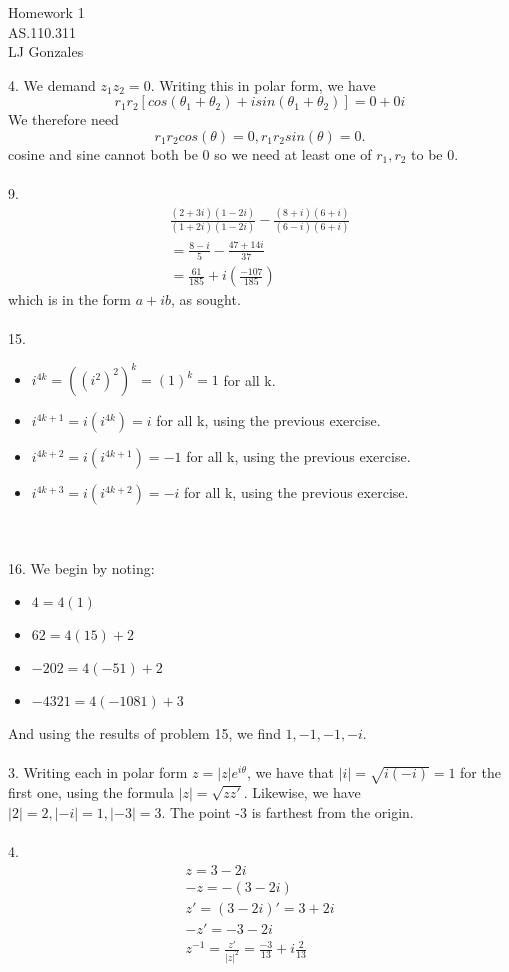 \documentclass{article}
\begin{document}
\begin{center}
Homework 1\\
AS.110.311\\
LJ Gonzales\\
\end{center}
4. We demand $z_1z_2=0$. Writing this in polar form, we have
\[
r_1r_2[cos(\theta _1+\theta _2)+isin(\theta _1 + \theta _2)]=0+0i\]
We therefore need
\[
r_1r_2cos(\theta)=0, r_1r_2sin(\theta)=0
.\] 
cosine and sine cannot both be 0 so we need at least one of $r_1, r_2$ to be 0.\\ \\
9.\begin{gather*}
\frac{(2+3i)(1-2i)}{(1+2i)(1-2i)}-\frac{(8+i)(6+i)}{(6-i)(6+i)} \\
=\frac{8-i}{5}-\frac{47+14i}{37} \\
=\frac{61}{185}+i(\frac{-107}{185})
\end{gather*}
which is in the form $a+ib$, as sought.
\\ \\
15. \begin{itemize}
	\item $i^{4k}=((i^2)^2)^{k} = (1)^{k}=1$ for all k.
	\item $i^{4k+1}=i(i^{4k})= i$ for all k, using the previous exercise.
	\item $i^{4k+2}=i(i^{4k+1})=-1$ for all k, using the previous exercise.
	\item $i^{4k+3}=i(i^{4k+2})=-i$ for all k, using the previous exercise.
\end{itemize} 
\\ \\
16. We begin by noting:
\begin{itemize}
	\item $4=4(1)$
	\item $62=4(15)+2$
	\item $-202=4(-51)+2$ 
	\item $-4321=4(-1081)+3$
\end{itemize}
And using the results of problem 15, we find $1, -1, -1, -i$.\\ \\3. Writing each in polar form $z=|z|e^{i\theta}$, we have that $|i|=\sqrt{i(-i)}=1$ for the first one, using the formula $|z|=\sqrt{zz'}$. Likewise, we have $|2|=2, |-i|=1, |-3|=3$. The point -3 is farthest from the origin.
\\ \\
4. \begin{gather*}
	z = 3-2i\\
	-z = -(3-2i)\\
	z'=(3-2i)'=3+2i\\
	-z'=-3-2i\\
	z^{-1}=\frac{z'}{|z|^{2}}=\frac{-3}{13}+i\frac{2}{13}
\end{gather*}
\end{document}
